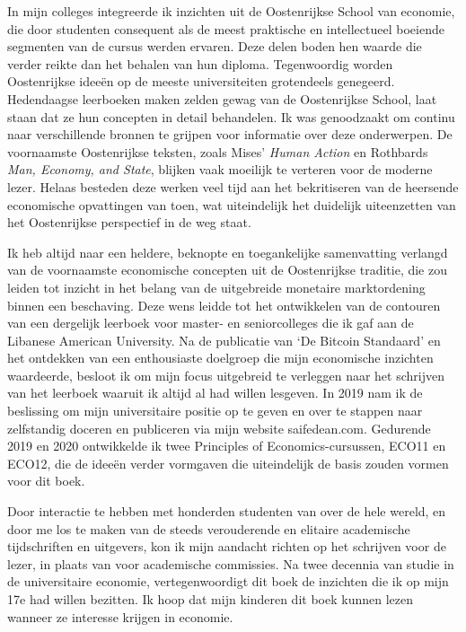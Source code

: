 \documentclass[
  a5paper,
  smalldemyvopaper,11pt,twoside,onecolumn,openright,extrafontsizes,
hidelinks]{memoir}
\begin{document}
In mijn colleges integreerde ik inzichten uit de Oostenrijkse School van
economie, die door studenten consequent als de meest praktische en
intellectueel boeiende segmenten van de cursus werden ervaren. Deze
delen boden hen waarde die verder reikte dan het behalen van hun
diploma. Tegenwoordig worden Oostenrijkse ideeën op de meeste
universiteiten grotendeels genegeerd. Hedendaagse leerboeken maken
zelden gewag van de Oostenrijkse School, laat staan dat ze hun concepten
in detail behandelen. Ik was genoodzaakt om continu naar verschillende
bronnen te grijpen voor informatie over deze onderwerpen. De voornaamste
Oostenrijkse teksten, zoals Mises' \emph{Human Action} en Rothbards
\emph{Man, Economy, and State}, blijken vaak moeilijk te verteren voor
de moderne lezer. Helaas besteden deze werken veel tijd aan het
bekritiseren van de heersende economische opvattingen van toen, wat
uiteindelijk het duidelijk uiteenzetten van het Oostenrijkse perspectief
in de weg staat.

Ik heb altijd naar een heldere, beknopte en toegankelijke samenvatting
verlangd van de voornaamste economische concepten uit de Oostenrijkse
traditie, die zou leiden tot inzicht in het belang van de uitgebreide
monetaire marktordening binnen een beschaving. Deze wens leidde tot het
ontwikkelen van de contouren van een dergelijk leerboek voor master- en
seniorcolleges die ik gaf aan de Libanese American University. Na de
publicatie van `De Bitcoin Standaard' en het ontdekken van een
enthousiaste doelgroep die mijn economische inzichten waardeerde,
besloot ik om mijn focus uitgebreid te verleggen naar het schrijven van
het leerboek waaruit ik altijd al had willen lesgeven. In 2019 nam ik de
beslissing om mijn universitaire positie op te geven en over te stappen
naar zelfstandig doceren en publiceren via mijn website saifedean.com.
Gedurende 2019 en 2020 ontwikkelde ik twee Principles of
Economics-cursussen, ECO11 en ECO12, die de ideeën verder vormgaven die
uiteindelijk de basis zouden vormen voor dit boek.

Door interactie te hebben met honderden studenten van over de hele
wereld, en door me los te maken van de steeds verouderende en elitaire
academische tijdschriften en uitgevers, kon ik mijn aandacht richten op
het schrijven voor de lezer, in plaats van voor academische commissies.
Na twee decennia van studie in de universitaire economie,
vertegenwoordigt dit boek de inzichten die ik op mijn 17e had willen
bezitten. Ik hoop dat mijn kinderen dit boek kunnen lezen wanneer ze
interesse krijgen in economie.
\end{document}
